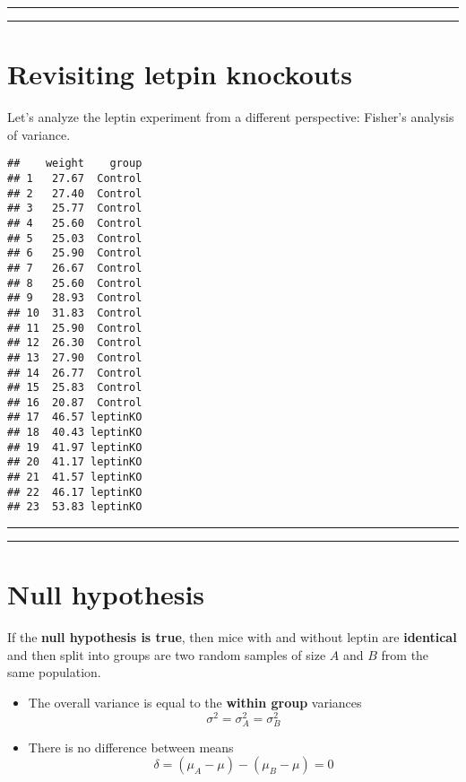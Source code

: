 \documentclass[
]{book}
\begin{document}
\begin{center}\rule{0.5\linewidth}{0.5pt}\end{center}

\begin{center}\rule{0.5\linewidth}{0.5pt}\end{center}

\hypertarget{revisiting-letpin-knockouts}{%
\section{Revisiting letpin knockouts}\label{revisiting-letpin-knockouts}}

Let's analyze the leptin experiment from a different perspective: Fisher's analysis of variance.

\begin{verbatim}
##    weight    group
## 1   27.67  Control
## 2   27.40  Control
## 3   25.77  Control
## 4   25.60  Control
## 5   25.03  Control
## 6   25.90  Control
## 7   26.67  Control
## 8   25.60  Control
## 9   28.93  Control
## 10  31.83  Control
## 11  25.90  Control
## 12  26.30  Control
## 13  27.90  Control
## 14  26.77  Control
## 15  25.83  Control
## 16  20.87  Control
## 17  46.57 leptinKO
## 18  40.43 leptinKO
## 19  41.97 leptinKO
## 20  41.17 leptinKO
## 21  41.57 leptinKO
## 22  46.17 leptinKO
## 23  53.83 leptinKO
\end{verbatim}

\begin{center}\rule{0.5\linewidth}{0.5pt}\end{center}

\begin{center}\rule{0.5\linewidth}{0.5pt}\end{center}

\hypertarget{null-hypothesis-6}{%
\section{Null hypothesis}\label{null-hypothesis-6}}

If the \textbf{null hypothesis is true}, then mice with and without leptin are \textbf{identical} and then split into groups are two random samples of size \(A\) and \(B\) from the same population.

\begin{itemize}
\item
  The overall variance is equal to the \textbf{within group} variances \[\sigma^2=\sigma^2_A=\sigma^2_B\]
\item
  There is no difference between means \[\delta=(\mu_A-\mu)-(\mu_B-\mu)=0\]
\end{itemize}
\end{document}
